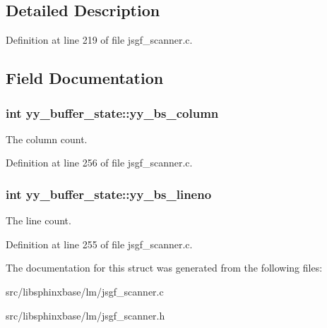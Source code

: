 \subsection{Detailed Description}


Definition at line 219 of file jsgf\-\_\-scanner.\-c.



\subsection{Field Documentation}
\subsubsection[{yy\-\_\-bs\-\_\-column}]{\setlength{\rightskip}{0pt plus 5cm}int yy\-\_\-buffer\-\_\-state\-::yy\-\_\-bs\-\_\-column}\label{structyy__buffer__state_a10c4fcd8be759e6bf11e6d3e8cdb0307}


The column count. 



Definition at line 256 of file jsgf\-\_\-scanner.\-c.

\subsubsection[{yy\-\_\-bs\-\_\-lineno}]{\setlength{\rightskip}{0pt plus 5cm}int yy\-\_\-buffer\-\_\-state\-::yy\-\_\-bs\-\_\-lineno}\label{structyy__buffer__state_a818e94bc9c766e683c60df1e9fd01199}


The line count. 



Definition at line 255 of file jsgf\-\_\-scanner.\-c.



The documentation for this struct was generated from the following files\-:\begin{DoxyCompactItemize}
\item 
src/libsphinxbase/lm/jsgf\-\_\-scanner.\-c\item 
src/libsphinxbase/lm/jsgf\-\_\-scanner.\-h\end{DoxyCompactItemize}
